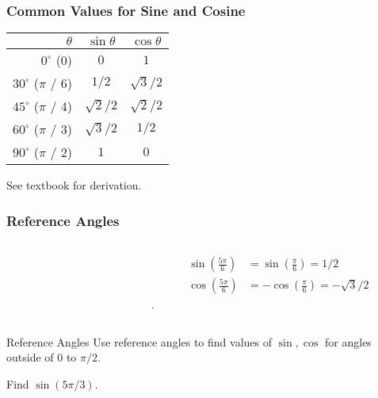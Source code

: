 \documentclass[20pt]{beamer}
\begin{document}
\begin{frame}
	\frametitle{Common Values for Sine and Cosine \footnotemark}
	\begin{table}
		\begin{tabular}{r | c | c  }
			$\theta$                        & $\sin \theta$ & $\cos \theta$ \\
			\hline \hline
			$0^\mathrm{\circ}$ (0)          & $0$           & $1$           \\
			$30^\mathrm{\circ}$ ($\pi$ / 6) & $1/2$         & $\sqrt{3}/2$  \\
			$45^\mathrm{\circ}$ ($\pi$ / 4) & $\sqrt{2}/2$  & $\sqrt{2}/2$  \\
			$60^\mathrm{\circ}$ ($\pi$ / 3) & $\sqrt{3}/2$  & $1/2$         \\
			$90^\mathrm{\circ}$ ($\pi$ / 2) & $1$           & $0$           \\
		\end{tabular}
	\end{table}
	See textbook for derivation.
\end{frame}

\begin{frame}
	\frametitle{Reference Angles \footnotemark}
	\begin{columns}
		\begin{column}{0.45\textwidth}
			\begin{figure}[ht]
				\centering
				\label{fig:coterminalangle}
			\end{figure}
		\end{column}
		\hfill
		\begin{column}{0.5\textwidth}
			\begin{align*}
				\sin \left(\frac{5\pi}{6}\right) & = \sin \left(\frac{\pi}{6}\right) = 1/2              \\
				\cos \left(\frac{5\pi}{6}\right) & = - \cos \left(\frac{\pi}{6}\right) = - \sqrt{3} / 2
			\end{align*}.
		\end{column}
	\end{columns}
	\begin{alertblock}{Reference Angles}
		Use reference angles to find values of $\sin , \cos$ for angles outside of $0$ to $\pi / 2$.
	\end{alertblock}
	\begin{example}
		Find $\sin (5\pi / 3)$.
	\end{example}
\end{frame}
\end{document}
